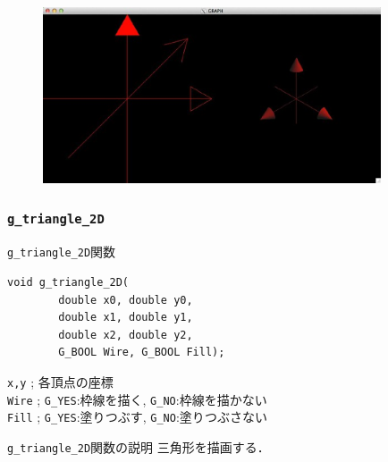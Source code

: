 \documentclass[platex,a4paper,12pt]{jsarticle}%
\begin{document}
\begin{figure}[htb]
\centering
	\includegraphics[width=100mm]{Canvas_g_arrow2.eps}
\end{figure}




\clearpage
\subsubsection{\texttt{g\_triangle\_2D}}

\begin{itembox}[l]{\texttt{g\_triangle\_2D}関数}
\begin{verbatim}
void g_triangle_2D(        
        double x0, double y0,
        double x1, double y1,
        double x2, double y2,
        G_BOOL Wire, G_BOOL Fill);
\end{verbatim}
\verb|x,y| ; 各頂点の座標\\
\verb|Wire| ; \verb|G_YES|:枠線を描く, \verb|G_NO|:枠線を描かない \\
\verb|Fill| ; \verb|G_YES|:塗りつぶす, \verb|G_NO|:塗りつぶさない 
\end{itembox}

\begin{itembox}[l]{\texttt{g\_triangle\_2D}関数の説明}
三角形を描画する．
\end{itembox}

\begin{figure}[htb]
\end{figure}
\end{document}
